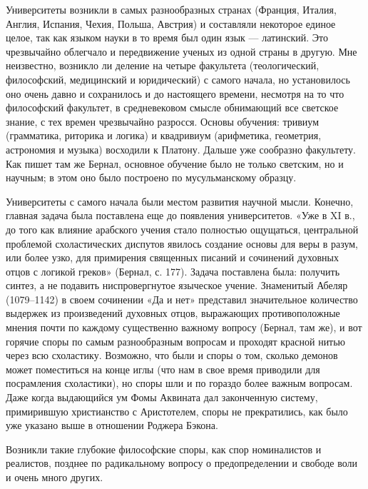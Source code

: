 Университеты возникли в самых  разнообразных странах (Франция, Италия,
Англия, Испания, Чехия, Польша, Австрия) и составляли некоторое единое
целое, так  как языком науки в  то время был один  язык --- латинский.
Это  чрезвычайно облегчало  и передвижение  ученых из  одной страны  в
другую.  Мне  неизвестно, возникло  ли  деление  на четыре  факультета
(теологический,  философский,  медицинский  и  юридический)  с  самого
начала, но установилось оно очень  давно и сохранилось и до настоящего
времени,  несмотря на  то что  философский факультет,  в средневековом
смысле  обнимающий  все  светское  знание, с  тех  времен  чрезвычайно
разросся. Основы  обучения: тривиум (грамматика, риторика  и логика) и
квадривиум (арифметика,  геометрия, астрономия  и музыка)  восходили к
Платону. Дальше  уже сообразно  факультету. Как  пишет там  же Бернал,
основное обучение  было не только светским,  но и научным; в  этом оно
было построено по мусульманскому образцу.

Университеты   с   самого   начала  были   местом   развития   научной
мысли.  Конечно,  главная  задача  была поставлена  еще  до  появления
университетов.  «Уже в  XI в.,  до того  как влияние  арабского учения
стало  полностью   ощущаться,  центральной   проблемой  схоластических
диспутов явилось создание основы для веры в разум, или более узко, для
примирения  священных писаний  и  сочинений духовных  отцов с  логикой
греков»  (Бернал, с.  177). Задача  поставлена была:  получить синтез,
а  не подавить  ниспровергнутое  языческое  учение. Знаменитый  Абеляр
(1079--1142)  в своем  сочинении  «Да и  нет» представил  значительное
количество  выдержек   из  произведений  духовных   отцов,  выражающих
противоположные мнения  почти по  каждому существенно  важному вопросу
(Бернал, там же), и вот  горячие споры по самым разнообразным вопросам
и проходят  красной нитью через  всю схоластику. Возможно, что  были и
споры о том, сколько демонов может  поместиться на конце иглы (что нам
в свое время приводили для посрамления  схоластики), но споры шли и по
гораздо более важным вопросам. Даже  когда выдающийся ум Фомы Аквината
дал законченную систему, примирившую христианство с Аристотелем, споры
не прекратились, как было уже указано выше в отношении Роджера Бэкона.

Возникли  такие глубокие  философские споры,  как спор  номиналистов и
реалистов, позднее по радикальному вопросу о предопределении и свободе
воли и очень много других.

